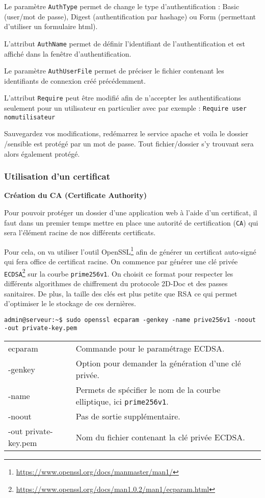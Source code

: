 Le paramètre \texttt{AuthType} permet de change le type d'authentification : Basic (user/mot de passe), Digest (authentification par hashage) ou Form (permettant d'utiliser un formulaire html).

L'attribut \texttt{AuthName} permet de définir l'identifiant de l'authentification et est affiché dans la fenêtre d'authentification.

Le paramètre \texttt{AuthUserFile} permet de préciser le fichier contenant les identifiants de connexion créé précédemment.

L'attribut \texttt{Require} peut être modifié afin de n'accepter les authentifications seulement pour un utilisateur en particulier avec par exemple : \texttt{Require user nomutilisateur}

Sauvegardez vos modifications, redémarrez le service apache et voila le dossier /sensible est protégé par un mot de passe. Tout fichier/dossier s'y trouvant sera alors également protégé. 

\subsubsection{Utilisation d'un certificat}
\textbf{Création du CA (Certificate Authority)}

Pour pouvoir protéger un dossier d'une application web à l'aide d'un certificat, il faut dans un premier temps mettre en place une autorité de certification (\texttt{CA}) qui sera l'élément racine de nos différents certificats.

Pour cela, on va utiliser l'outil OpenSSL\footnote{\url{https://www.openssl.org/docs/manmaster/man1/}} afin de générer un certificat auto-signé qui fera office de certificat racine.
\newpage
On commence par générer une clé privée \texttt{ECDSA}\footnote{\url{https://www.openssl.org/docs/man1.0.2/man1/ecparam.html}} sur la courbe \texttt{prime256v1}. On choisit ce format pour respecter les différents algorithmes de chiffrement du protocole 2D-Doc et des passes sanitaires. De plus, la taille des clés est plus petite que RSA ce qui permet d'optimiser le le stockage de ces dernières.
\begin{verbatim}
admin@serveur:~$ sudo openssl ecparam -genkey -name prive256v1 -noout -out private-key.pem
\end{verbatim}

\begin{tabular}{l|p{10cm}}
    ecparam & Commande pour le paramétrage ECDSA.\\
    -genkey &  Option pour demander la génération d'une clé privée.\\
    -name & Permets de spécifier le nom de la courbe elliptique, ici \texttt{prime256v1}. \\
    -noout & Pas de sortie supplémentaire. \\
    -out private-key.pem & Nom du fichier contenant la clé privée ECDSA.\\
\end{tabular}

